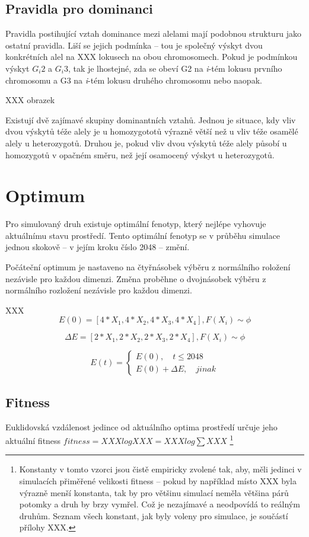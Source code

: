 \subsection{Pravidla pro dominanci}

Pravidla postihující vztah dominance mezi alelami mají podobnou strukturu jako ostatní pravidla. Liší se jejich podmínka -- tou je společný výskyt dvou konkrétních alel na XXX lokusech na obou chromosomech. Pokud je podmínkou výskyt $G_i{2}$ a $G_i{3}$, tak je lhostejné, zda se obeví G2 na \textit{i}-tém lokusu prvního chromosomu a G3 na \textit{i}-tém lokusu druhého chromosomu nebo naopak.

XXX obrazek

Existují dvě zajímavé skupiny dominantních vztahů. Jednou je situace, kdy vliv dvou výskytů téže alely je u homozygototů výrazně větší než u vliv téže osamělé alely u heterozygotů. Druhou je, pokud vliv dvou výskytů téže alely působí u homozygotů v opačném směru, než její osamocený výskyt u heterozygotů.



\section{Optimum}

Pro simulovaný druh existuje optimální fenotyp, který nejlépe vyhovuje aktuálnímu stavu prostředí. Tento optimální fenotyp se v průběhu simulace jednou skokově -- v jejím kroku číslo 2048 -- změní.

Počáteční optimum je nastaveno na čtyřnásobek výběru z normálního roložení nezávisle pro každou dimenzi. Změna proběhne o dvojnásobek výběru z normálního rozložení nezávisle pro každou dimenzi.

XXX
$$
E(0) =  [4 * X_1, 4 * X_2, 4 * X_3, 4 * X_4], F(X_i) \sim \phi
$$

$$
\Delta{E} = [2 * X_1, 2 * X_2, 2 * X_3, 2 * X_4], F(X_i) \sim \phi
$$

$$
E(t) = \left \{
     \begin{array}{l} E(0), \quad t \leq 2048 \\
                      E(0) + \Delta{E}, \quad jinak
\end{array} \right .
$$

\subsection{Fitness}

Euklidovská vzdálenost jedince od aktuálního optima prostředí určuje jeho aktuální fitness $fitness = XXX log XXX = XXX log \sum XXX$
\footnote{Konstanty v tomto vzorci jsou čistě empiricky zvolené tak, aby, měli jedinci v simulacích přiměřené velikosti fitness -- pokud by například místo XXX byla výrazně menší konstanta, tak by pro většinu simulací neměla většina párů potomky a druh by brzy vymřel. Což je nezajímavé a neodpovídá to reálným druhům. Seznam všech konstant, jak byly voleny pro simulace, je součástí přílohy XXX.}

